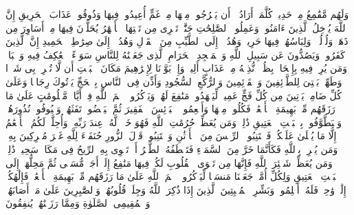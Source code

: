 \startbuffer[\q:22:21]
وَلَهُم مَّقَٰمِعُ مِنۡ حَدِیدࣲ%
\stopbuffer
\startbuffer[\q:22:22]
كُلَّمَاۤ أَرَادُوۤا۟ أَن یَخۡرُجُوا۟ مِنۡهَا مِنۡ غَمٍّ أُعِیدُوا۟ فِیهَا وَذُوقُوا۟ عَذَابَ ٱلۡحَرِیقِ%
\stopbuffer
\startbuffer[\q:22:23]
إِنَّ ٱللَّهَ یُدۡخِلُ ٱلَّذِینَ ءَامَنُوا۟ وَعَمِلُوا۟ ٱلصَّٰلِحَٰتِ جَنَّٰتࣲ تَجۡرِی مِن تَحۡتِهَا ٱلۡأَنۡهَٰرُ یُحَلَّوۡنَ فِیهَا مِنۡ أَسَاوِرَ مِن ذَهَبࣲ وَلُؤۡلُؤࣰاۖ وَلِبَاسُهُمۡ فِیهَا حَرِیرࣱ%
\stopbuffer
\startbuffer[\q:22:24]
وَهُدُوۤا۟ إِلَى ٱلطَّیِّبِ مِنَ ٱلۡقَوۡلِ وَهُدُوۤا۟ إِلَىٰ صِرَٰطِ ٱلۡحَمِیدِ%
\stopbuffer
\startbuffer[\q:22:25]
إِنَّ ٱلَّذِینَ كَفَرُوا۟ وَیَصُدُّونَ عَن سَبِیلِ ٱللَّهِ وَٱلۡمَسۡجِدِ ٱلۡحَرَامِ ٱلَّذِی جَعَلۡنَٰهُ لِلنَّاسِ سَوَاۤءً ٱلۡعَٰكِفُ فِیهِ وَٱلۡبَادِۚ وَمَن یُرِدۡ فِیهِ بِإِلۡحَادِۭ بِظُلۡمࣲ نُّذِقۡهُ مِنۡ عَذَابٍ أَلِیمࣲ%
\stopbuffer
\startbuffer[\q:22:26]
وَإِذۡ بَوَّأۡنَا لِإِبۡرَٰهِیمَ مَكَانَ ٱلۡبَیۡتِ أَن لَّا تُشۡرِكۡ بِی شَیۡءࣰا وَطَهِّرۡ بَیۡتِیَ لِلطَّاۤئِفِینَ وَٱلۡقَاۤئِمِینَ وَٱلرُّكَّعِ ٱلسُّجُودِ%
\stopbuffer
\startbuffer[\q:22:27]
وَأَذِّن فِی ٱلنَّاسِ بِٱلۡحَجِّ یَأۡتُوكَ رِجَالࣰا وَعَلَىٰ كُلِّ ضَامِرࣲ یَأۡتِینَ مِن كُلِّ فَجٍّ عَمِیقࣲ%
\stopbuffer
\startbuffer[\q:22:28]
لِّیَشۡهَدُوا۟ مَنَٰفِعَ لَهُمۡ وَیَذۡكُرُوا۟ ٱسۡمَ ٱللَّهِ فِیۤ أَیَّامࣲ مَّعۡلُومَٰتٍ عَلَىٰ مَا رَزَقَهُم مِّنۢ بَهِیمَةِ ٱلۡأَنۡعَٰمِۖ فَكُلُوا۟ مِنۡهَا وَأَطۡعِمُوا۟ ٱلۡبَاۤئِسَ ٱلۡفَقِیرَ%
\stopbuffer
\startbuffer[\q:22:29]
ثُمَّ لۡیَقۡضُوا۟ تَفَثَهُمۡ وَلۡیُوفُوا۟ نُذُورَهُمۡ وَلۡیَطَّوَّفُوا۟ بِٱلۡبَیۡتِ ٱلۡعَتِیقِ%
\stopbuffer
\startbuffer[\q:22:30]
ذَٰلِكَۖ وَمَن یُعَظِّمۡ حُرُمَٰتِ ٱللَّهِ فَهُوَ خَیۡرࣱ لَّهُۥ عِندَ رَبِّهِۦۗ وَأُحِلَّتۡ لَكُمُ ٱلۡأَنۡعَٰمُ إِلَّا مَا یُتۡلَىٰ عَلَیۡكُمۡۖ فَٱجۡتَنِبُوا۟ ٱلرِّجۡسَ مِنَ ٱلۡأَوۡثَٰنِ وَٱجۡتَنِبُوا۟ قَوۡلَ ٱلزُّورِ%
\stopbuffer
\startbuffer[\q:22:31]
حُنَفَاۤءَ لِلَّهِ غَیۡرَ مُشۡرِكِینَ بِهِۦۚ وَمَن یُشۡرِكۡ بِٱللَّهِ فَكَأَنَّمَا خَرَّ مِنَ ٱلسَّمَاۤءِ فَتَخۡطَفُهُ ٱلطَّیۡرُ أَوۡ تَهۡوِی بِهِ ٱلرِّیحُ فِی مَكَانࣲ سَحِیقࣲ%
\stopbuffer
\startbuffer[\q:22:32]
ذَٰلِكَۖ وَمَن یُعَظِّمۡ شَعَٰۤئِرَ ٱللَّهِ فَإِنَّهَا مِن تَقۡوَى ٱلۡقُلُوبِ%
\stopbuffer
\startbuffer[\q:22:33]
لَكُمۡ فِیهَا مَنَٰفِعُ إِلَىٰۤ أَجَلࣲ مُّسَمࣰّى ثُمَّ مَحِلُّهَاۤ إِلَى ٱلۡبَیۡتِ ٱلۡعَتِیقِ%
\stopbuffer
\startbuffer[\q:22:34]
وَلِكُلِّ أُمَّةࣲ جَعَلۡنَا مَنسَكࣰا لِّیَذۡكُرُوا۟ ٱسۡمَ ٱللَّهِ عَلَىٰ مَا رَزَقَهُم مِّنۢ بَهِیمَةِ ٱلۡأَنۡعَٰمِۗ فَإِلَٰهُكُمۡ إِلَٰهࣱ وَٰحِدࣱ فَلَهُۥۤ أَسۡلِمُوا۟ۗ وَبَشِّرِ ٱلۡمُخۡبِتِینَ%
\stopbuffer
\startbuffer[\q:22:35]
ٱلَّذِینَ إِذَا ذُكِرَ ٱللَّهُ وَجِلَتۡ قُلُوبُهُمۡ وَٱلصَّٰبِرِینَ عَلَىٰ مَاۤ أَصَابَهُمۡ وَٱلۡمُقِیمِی ٱلصَّلَوٰةِ وَمِمَّا رَزَقۡنَٰهُمۡ یُنفِقُونَ%
